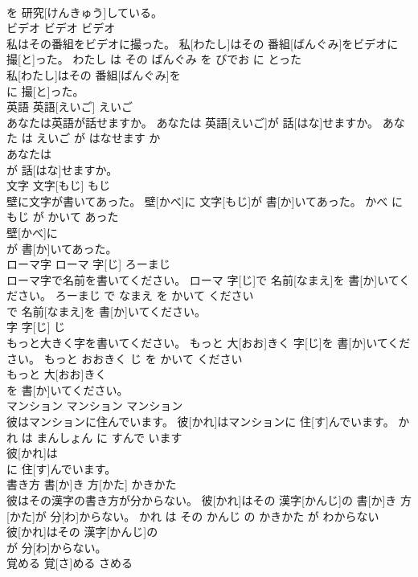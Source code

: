 \documentclass[8pt]{extreport}
\begin{document}
\begin{CJK}{UTF8}{min}
\\	を 研究[けんきゅう]している。			
\\	ビデオ	ビデオ	ビデオ	
\\	私はその番組をビデオに撮った。	私[わたし]はその 番組[ばんぐみ]をビデオに 撮[と]った。	わたし は その ばんぐみ を びでお に とった	
\\	私[わたし]はその 番組[ばんぐみ]を
\\	に 撮[と]った。			
\\	英語	英語[えいご]	えいご	
\\	あなたは英語が話せますか。	あなたは 英語[えいご]が 話[はな]せますか。	あなた は えいご が はなせます か	
\\	あなたは
\\	が 話[はな]せますか。			
\\	文字	文字[もじ]	もじ	
\\	壁に文字が書いてあった。	壁[かべ]に 文字[もじ]が 書[か]いてあった。	かべ に もじ が かいて あった	
\\	壁[かべ]に
\\	が 書[か]いてあった。			
\\	ローマ字	ローマ 字[じ]	ろーまじ	
\\	ローマ字で名前を書いてください。	ローマ 字[じ]で 名前[なまえ]を 書[か]いてください。	ろーまじ で なまえ を かいて ください	
\\	で 名前[なまえ]を 書[か]いてください。			
\\	字	字[じ]	じ	
\\	もっと大きく字を書いてください。	もっと 大[おお]きく 字[じ]を 書[か]いてください。	もっと おおきく じ を かいて ください	
\\	もっと 大[おお]きく
\\	を 書[か]いてください。			
\\	マンション	マンション	マンション	
\\	彼はマンションに住んでいます。	彼[かれ]はマンションに 住[す]んでいます。	かれ は まんしょん に すんで います	
\\	彼[かれ]は
\\	に 住[す]んでいます。			
\\	書き方	書[か]き 方[かた]	かきかた	
\\	彼はその漢字の書き方が分からない。	彼[かれ]はその 漢字[かんじ]の 書[か]き 方[かた]が 分[わ]からない。	かれ は その かんじ の かきかた が わからない	
\\	彼[かれ]はその 漢字[かんじ]の
\\	が 分[わ]からない。			
\\	覚める	覚[さ]める	さめる	

\end{CJK}
\end{document}
